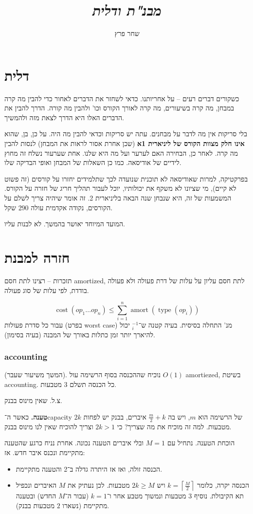 \documentclass[]{article}
\author{שחר פרץ}
\title{\textit{מבנ"ת ודלית}}
\newcommand\rc    {\right\rceil}
\newcommand\lc    {\left\lceil}
\newcommand\op    {^{-1}}
\theoremstyle{definition}
\DeclareMathOperator\amort   {amort}
\DeclareMathOperator\type    {type}
\DeclareMathOperator\cost    {cost}
\begin{document}
	\maketitle
	\section{דלית}
	כשקורים דברים רעים – על אחריותנו. כדאי לשחזר את הדברים לאחור כדי להבין מה קרה במבחן, מה קרה בשיעורים, מה קרה לאורך הקורס וכו' ולהבין מה קורה. הדרך להבין את הדברים האלו היא הדרך לצאת מזה ולהמשיך. 
	
	בלי סריקות אין מה לדבר על מבחנים. עתה יש סריקות וכדאי להבין מה היה. על כן, בן, שהוא \textbf{אינו חלק מצוות הקורס של ליניארית 1א} (שכן אחרת אסור לראות את המבחן) לנסות להבין מה קרה. לאחר כן, הבחירה האם לערער ועל מה היא שלנו. אחת שערעור נשלח זה מחוץ לידיים של אודיסאה. כמו כן השאלות של המבחן ואופי הבדיקה שלו. 
	
	בפרקטיקה, למרות שאודיסאה לא תוכנית שנועדה לכך שתלמידים יחזרו על קורסים (זה פשוט לא קיים), מי שציונו לא משקף את יכולותיו, יוכל לעבור תהליך חריג של חזרה על הקורס. המשמעות של זה, היא שנבחן שנה הבאה בליניארית 2. זה אומר שיהיה צריך לשלם על הקורסים, נקודה אקדמית עולה 290 שקל. 
	
	המועד המיוחד יאושר בהמשך. לא לבנות עליו. 
	
	\section{חזרה למבנת}
	תזכרות – רצינו לתת חסם amortized, לתת חסם עליון על עלות של דרת פעולה ולא פעולה בודדת, לפי עלות של סוג פעולה. 
	
	\[ \cost(op_1 \dots op_n) \le \sum_{i = 1}^{n} \amort(\type(op_i)) \]
	עבור כל סדרת פעולות (בפרט worst case) מנ' התחלה בסיסית. בעיה קטנה ש־$\op_i$ יכול להיארך יותר זמן כתלות באורך של המבנה (בעיה בסימון). 
	
	\subsubsection{accounting}
	(המשך משיעור שעבר). נוכיח שההכנסה בסוף הרשימה עול $O(1)$ amortiezed, בשיטת accounting. כל הכנסה תשלם 3 מטבעות. 
	
	צ.ל. שאין מינוס בבנק. 
	
	\textbf{טענה. }כאשר ה־capacity של הרשימה הוא $m$, ויש בה $\frac{m}{2} + k$ איברים, בבנק יש לפחות $2k$ מטבעות. למה זה מוכיח את מה שצריך? כי $2k > 1$ וצריך להוכיח שאין לנו מינוס בבנק. 
	
	הוכחת הטענה. נתחיל עם $M = 1$ ובלי איברים הטענה נכונה. אחרת נניח כרגע שהטענה מתקיימת ונכנס איבר חדש. אז: 
	\begin{itemize}
		\item הכנסה זולה, ואז אז היתרה גדלה ב־2 והטענה מתקיימת. 
		\item הכנסה יקרה, כלומר $k = \lc \frac{M}{2} \rc$ ויש $2k \ge M$ מטבעות. לכן נעתיק את $M$ האיברים ונכפיל תא הקיבולת. נוסיף $3$ מטבעות ונמשוך מטבע אחר ו־$k = 1$ (עבור ה־$M$ החדש) ובטענה מתקיימת (נשארו $2$ מטבעות בבנק). 
	\end{itemize}
	
\end{document}
